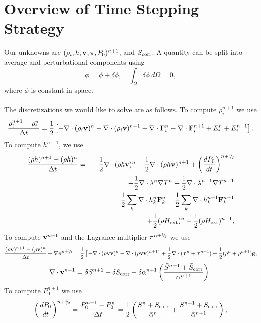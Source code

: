 \documentclass[final]{siamltex}
\newcommand{\sfrac}[2]{\mathchoice
  {\kern0em\raise.5ex\hbox{\the\scriptfont0 #1}\kern-.15em/
   \kern-.15em\lower.25ex\hbox{\the\scriptfont0 #2}}
  {\kern0em\raise.5ex\hbox{\the\scriptfont0 #1}\kern-.15em/
   \kern-.15em\lower.25ex\hbox{\the\scriptfont0 #2}}
  {\kern0em\raise.5ex\hbox{\the\scriptscriptfont0 #1}\kern-.2em/
   \kern-.15em\lower.25ex\hbox{\the\scriptscriptfont0 #2}}
  {#1\!/#2}}
\def\Fb {{\bf F}}
\def\gb {{\bf g}}
\def\vb {{\bf v}}
\def\taub   {\boldsymbol{\tau}}
\def\Hext {H_{\rm ext}}
\def\half   {\frac{1}{2}}
\def\myhalf {\sfrac{1}{2}}
\begin{document}
\section{Overview of Time Stepping Strategy}
Our unknowns are $(\rho_i,h,\vb,\pi,P_0)^{n+1}$, and $S_{\rm corr}$.  A quantity can
be split into average and perturbational components using
\begin{equation}
\phi = \bar\phi + \delta\phi, \quad \int_\Omega \delta\phi~d\Omega = 0,
\end{equation}
where $\bar\phi$ is constant in space.\\ \\
The discretizations we would like to solve are as follows.  To compute $\rho_i^{n+1}$ we use
\begin{equation}
\frac{\rho_i^{n+1} - \rho_i^n}{\Delta t} = \half\left[-\nabla\cdot(\rho_i\vb)^n -\nabla\cdot(\rho_i\vb)^{n+1} - \nabla\cdot\Fb_i^n - \nabla\cdot\Fb_i^{n+1} + E_i^n + E_i^{n+1}\right].
\end{equation}
To compute $h^{n+1}$, we use
\begin{eqnarray}
\frac{(\rho h)^{n+1} - (\rho h)^n}{\Delta t} &=& -\half\nabla\cdot(\rho h\vb)^n - \half\nabla\cdot(\rho h\vb)^{n+1} + \left(\frac{dP_0}{dt}\right)^{n+\myhalf}\nonumber\\
&&+ \half\nabla\cdot\lambda^n\nabla T^n + \half\nabla\cdot\lambda^{n+1}\nabla T^{n+1}\nonumber\\
&&- \half\sum_k\nabla\cdot h_k^n\Fb_k^n - \half\sum_k\nabla\cdot h_k^{n+1}\Fb_k^{n+1}\nonumber\\
&&+ \half(\rho\Hext)^n + \half(\rho\Hext)^{n+1},
\end{eqnarray}
To compute $\vb^{n+1}$ and the Lagrance multiplier $\pi^{n+\myhalf}$ we use
\begin{equation}
\frac{(\rho\vb)^{n+1} - (\rho\vb)^n}{\Delta t} + \nabla\pi^{n+\myhalf} = \half\left[-\nabla\cdot(\rho\vb\vb)^n - \nabla\cdot(\rho\vb\vb)^{n+1}\right] + \frac{1}{2}\nabla\cdot(\taub^n + \taub^{n+1}) + \frac{1}{2}(\rho^n + \rho^{n+1})\gb,
\end{equation}
\begin{equation}
\nabla\cdot\vb^{n+1} = \delta S^{n+1} + \delta S_{\rm corr} - \delta\alpha^{n+1}\left(\frac{\bar{S}^{n+1} + \bar{S}_{\rm corr}}{\bar{\alpha}^{n+1}}\right).\label{eq:div_constraint}
\end{equation}
To compute $P_0^{n+1}$ we use
\begin{equation}
\left(\frac{dP_0}{dt}\right)^{n+\myhalf} = \frac{P_0^{n+1} - P_0^n}{\Delta t} = \half\left(\frac{\bar S^n + \bar S_{\rm corr}}{\bar\alpha^n} + \frac{\bar S^{n+1} + \bar S_{\rm corr}}{\bar\alpha^{n+1}}\right),\label{eq:P0_update}
\end{equation}
\end{document}
